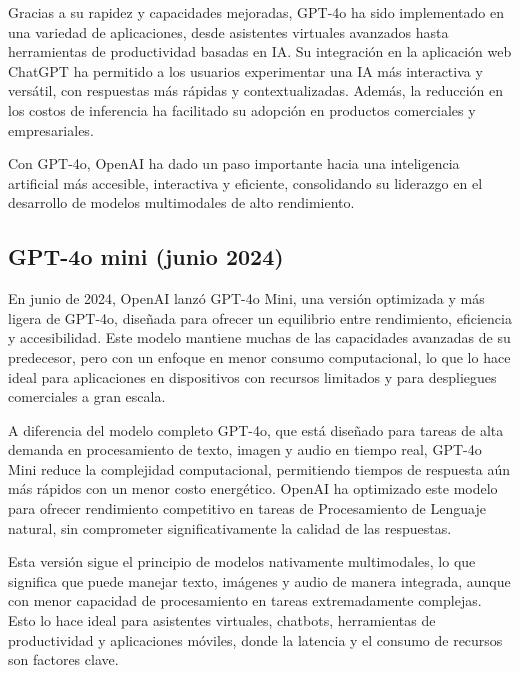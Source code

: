 Gracias a su rapidez y capacidades mejoradas, GPT-4o ha sido implementado en una variedad de aplicaciones, desde asistentes virtuales avanzados hasta herramientas de productividad basadas en IA. 
Su integración en la aplicación web ChatGPT ha permitido a los usuarios experimentar una IA más interactiva y versátil, con respuestas más rápidas y contextualizadas. 
Además, la reducción en los costos de inferencia ha facilitado su adopción en productos comerciales y empresariales.

Con GPT-4o, OpenAI ha dado un paso importante hacia una inteligencia artificial más accesible, interactiva y eficiente, consolidando su liderazgo en el desarrollo de modelos multimodales de alto rendimiento.


\subsection{GPT-4o mini (junio 2024)}

En junio de 2024, OpenAI lanzó GPT-4o Mini, una versión optimizada y más ligera de GPT-4o, diseñada para ofrecer un equilibrio entre rendimiento, eficiencia y accesibilidad. 
Este modelo mantiene muchas de las capacidades avanzadas de su predecesor, pero con un enfoque en menor consumo computacional, lo que lo hace ideal para aplicaciones en dispositivos con recursos limitados y para despliegues comerciales a gran escala.

A diferencia del modelo completo GPT-4o, que está diseñado para tareas de alta demanda en procesamiento de texto, imagen y audio en tiempo real, GPT-4o Mini reduce la complejidad computacional, permitiendo tiempos de respuesta aún más rápidos con un menor costo energético. 
OpenAI ha optimizado este modelo para ofrecer rendimiento competitivo en tareas de Procesamiento de Lenguaje natural, sin comprometer significativamente la calidad de las respuestas.

Esta versión sigue el principio de modelos nativamente multimodales, lo que significa que puede manejar texto, imágenes y audio de manera integrada, aunque con menor capacidad de procesamiento en tareas extremadamente complejas. 
Esto lo hace ideal para asistentes virtuales, chatbots, herramientas de productividad y aplicaciones móviles, donde la latencia y el consumo de recursos son factores clave.

